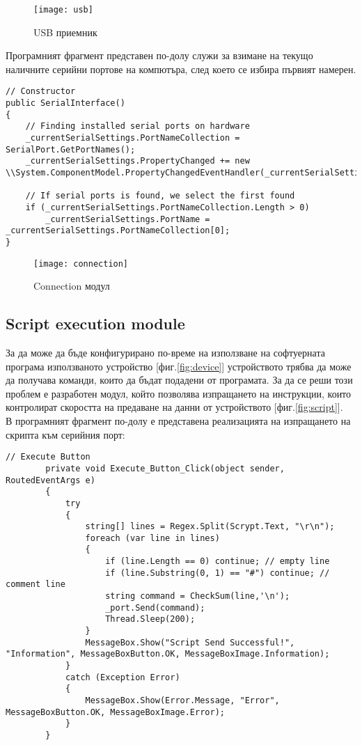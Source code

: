 \begin{figure}
    \centerline{\texttt{[image: usb]}}
    \caption{USB приемник}
    \label{fig:usb}
\end{figure}

Програмният фрагмент представен по-долу служи за взимане на текущо наличните серийни портове на компютъра, след което се избира първият намерен.
\begin{lstlisting}
// Constructor
public SerialInterface()
{
    // Finding installed serial ports on hardware
    _currentSerialSettings.PortNameCollection = SerialPort.GetPortNames();
    _currentSerialSettings.PropertyChanged += new \\System.ComponentModel.PropertyChangedEventHandler(_currentSerialSettings_PropertyChanged);

    // If serial ports is found, we select the first found
    if (_currentSerialSettings.PortNameCollection.Length > 0)
        _currentSerialSettings.PortName = _currentSerialSettings.PortNameCollection[0];
}
\end{lstlisting}



\begin{figure}
    \centerline{\texttt{[image: connection]}}
    \caption{Connection модул}
    \label{fig:connection}
\end{figure}




\subsection{Script execution module}
За да може да бъде конфигурирано по-време на използване на софтуерната програма използваното устройство [фиг.\ref{fig:device}] устройството трябва да може да получава команди, които да бъдат подадени от програмата. За да се реши този проблем е разработен модул, който позволява изпращането на инструкции, които контролират скоростта на предаване на данни от устройството [фиг.\ref{fig:script}].
\\
В програмният фрагмент по-долу е представена реализацията на изпращането на скрипта към серийния порт:
\begin{lstlisting}
// Execute Button
        private void Execute_Button_Click(object sender, RoutedEventArgs e)
        {
            try
            {
                string[] lines = Regex.Split(Scrypt.Text, "\r\n");
                foreach (var line in lines)
                {                    
                    if (line.Length == 0) continue; // empty line                    
                    if (line.Substring(0, 1) == "#") continue; // comment line
                    string command = CheckSum(line,'\n');
                    _port.Send(command); 
                    Thread.Sleep(200); 
                }
                MessageBox.Show("Script Send Successful!", "Information", MessageBoxButton.OK, MessageBoxImage.Information);
            }
            catch (Exception Error)
            {
                MessageBox.Show(Error.Message, "Error", MessageBoxButton.OK, MessageBoxImage.Error);
            }
        }
\end{lstlisting}




